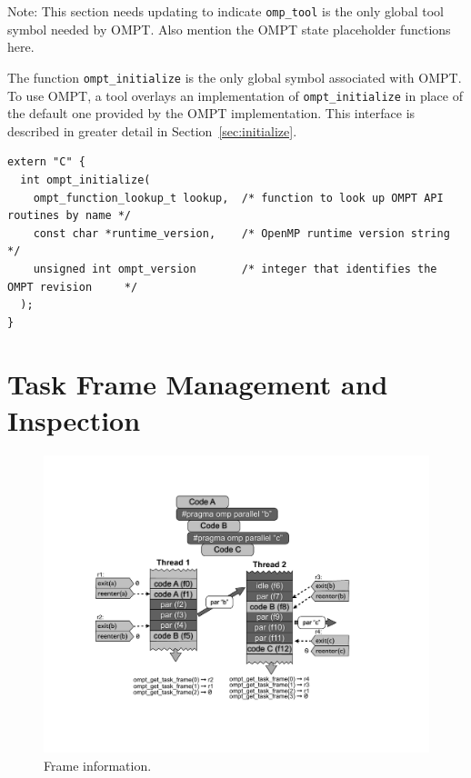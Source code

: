 \documentclass{article}
\begin{document}
{\noindent
{\color{red} Note: This section needs updating to indicate \verb|omp_tool| is the only global tool symbol needed by OMPT. Also mention the OMPT state placeholder functions here.}

The function \verb|ompt_initialize| is the only global symbol associated with OMPT. To use OMPT, a tool overlays an implementation of \verb|ompt_initialize| in place of the default one provided by the OMPT implementation. This interface is described in greater detail in Section~\ref{sec:initialize}.
\begin{verbatim}
extern "C" {
  int ompt_initialize(
    ompt_function_lookup_t lookup,  /* function to look up OMPT API routines by name */
    const char *runtime_version,    /* OpenMP runtime version string                 */
    unsigned int ompt_version       /* integer that identifies the OMPT revision     */
  );
}

\end{verbatim}




\clearpage
\section{Task Frame Management and Inspection}
\label{app:frame}

   \begin{figure}[h]
    \centering
        \includegraphics[scale=0.55]{callstack-cropped.pdf}
    \caption{Frame information.}
    \label{fig:frame}
\end{figure}

}
\end{document}
